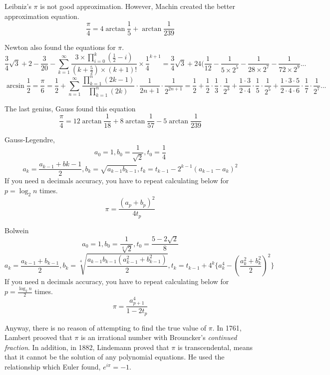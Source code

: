 \documentclass{jreport}
\begin{document}
Leibniz's $\pi$ is not good approximation. However, Machin created the better approximation equation.
\[\frac{\pi}{4}=4\arctan\frac{1}{5}+\arctan\frac{1}{239}\]

Newton also found the equations for $\pi$.
\[\frac{3}{4}\sqrt{3}+2-\frac{3}{20}-\sum_{k=1}^{\infty}\frac{3\times\prod_{i=0}^{k}(\frac{1}{2}-i)}{(k+\frac{5}{2})\times (k+1)!}\times \frac{1}{4}^{k+1}=\frac{3}{4}\sqrt{3}+24(\frac{1}{12}-\frac{1}{5\times 2^5}-\frac{1}{28\times 2^7}-\frac{1}{72\times 2^9}...\]
\[\arcsin \frac{1}{2}=\frac{\pi}{6}=\frac{1}{2}+\sum_{n=1}^{\infty} \frac{\prod_{k=1}^{n}(2k-1)}{\prod_{k=1}^{n}(2k)}\cdot\frac{1}{2n+1}\cdot\frac{1}{2^{2n+1}}=\frac{1}{2}+\frac{1}{2}\cdot\frac{1}{3}\cdot\frac{1}{2^3}+\frac{1\cdot3}{2\cdot4}\cdot\frac{1}{5}\cdot\frac{1}{2^5}+\frac{1\cdot3\cdot5}{2\cdot4\cdot6}\cdot\frac{1}{7}\cdot\frac{1}{2^7}...\]

The last genius, Gauss found this equation
\[\frac{\pi}{4}=12\arctan\frac{1}{18}+8\arctan\frac{1}{57}-5\arctan\frac{1}{239}\]

Gauss-Legendre,
\[a_{0}=1,b_{0}=\frac{1}{\sqrt{2}},t_{0}=\frac{1}{4}\]
\[a_{k}=\frac{a_{k-1}+b{k-1}}{2},b_{k}=\sqrt{a_{k-1}b_{k-1}}, t_{k}=t_{k-1}-2^{k-1}(a_{k-1}-a_{k})^2\]
If you need n decimals accuracy, you have to repeat calculating below for $p=\log_{2}n$ times.
\[\pi=\frac{(a_{p}+b_{p})^2}{4t_{p}}\]

Bolwein
\[a_{0}=1,b_{0}=\frac{1}{\sqrt[4]{2}},t_{0}=\frac{5-2\sqrt{2}}{8}\]
\[a_{k}=\frac{a_{k-1}+b_{k-1}}{2},b_{k}=\sqrt[4]{\frac{a_{k-1}b_{k-1}(a_{k-1}^2+b_{k-1}^2)}{2}},t_{k}=t_{k-1}+4^k\{a_{k}^4-(\frac{a_{k}^2+b_{k}^2}{2})^2\}\]
If you need n decimals accuracy, you have to repeat calculating below for $p=\frac{\log_{2}n}{2}$ times.
\[\pi=\frac{a_{p+1}^4}{1-2t_{p}}\]

Anyway, there is no reason of attempting to find the true value of $\pi$. In 1761, Lambert prooved that $\pi$ is an irrational number with Brouncker's \textit{continued fraction}. In addition, in 1882, Lindemann proved that $\pi$ is transcendental, means that it cannot be the solution of any polynomial equations. He used the relationship which Euler found, $e^{i\pi}=-1$.

\pagebreak
\end{document}
